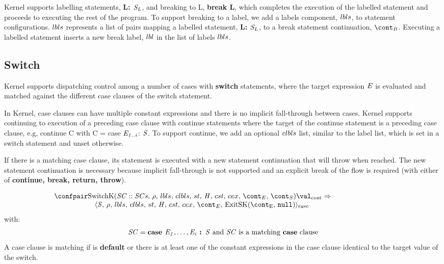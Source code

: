 \documentclass{article}
\begin{document}
Kernel supports labelling statements, \textbf{L: $\mathit{S}_{L}$}, and breaking to L, \textbf{break L}, which completes the execution of the labelled statement and proceeds to executing the rest of the program.
To support breaking to a label, we add a labels component, $lbls$, to statement configurations.
$lbls$ represents a list of pairs mapping a labelled statement, \textbf{L: $\mathit{S}_L$}, to a break statement continuation, $\bcont$.
Executing a labelled statement inserts a new break label, $lbl$ in the list of labels $lbls$.

\subsection{Switch}
Kernel supports dispatching control among a number of cases with \textbf{switch} statements, where the target expression $\mathit{E}$ is evaluated and matched against the different case clauses of the switch statement.

In Kernel, case clauses can have multiple constant expressions and there is no implicit fall-through between cases.
Kernel supports continuing to execution of a preceding case clause with continue statements where the target of the continue statement is a preceding case clause, e.g, continue C with C = case $\mathit{E}_\mathit{1..i}$: $\mathit{S}$.
To support continue, we add an optional $clbls$ list, similar to the label list, which is set in a switch statement and unset otherwise.

If there is a matching case clause, its statement is executed with a new statement continuation that will throw when reached.
The new statement continuation is necessary because implicit fall-through is not supported and an explicit break of the flow is required (with either of \textbf{continue, break, return, throw}).

\[
  \begin{array}{lcl}
	\contconf{\SwitchK{\scase :: \scases}{\clbls}}{\val}
	\Rightarrow \hspace{30mm}\\
	\hspace{20mm}\execconf{\stmt}{\env}{\lbls}{\clbls}{\handler}{\cstrace}{\cex}{\econt}{\ExitSK{\tt{null}}}
  \end{array}
\]
with:
\[
	\mathit{SC} = \textbf{case } \mathit{E}_\mathit{1}, \dots, \mathit{E}_\mathit{i} \textbf{ : } \mathit{S} \textrm{ and } \mathit{SC} \textrm{ is a matching \textbf{case} clause}
\]
A case clause is matching if is \textbf{default} or there is at least one of the constant expressions in the case clause identical to the target value of the switch.
\end{document}
